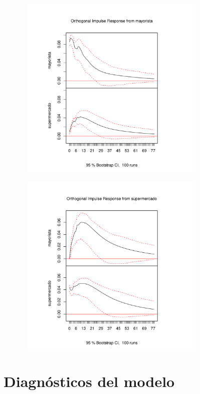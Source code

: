 \documentclass[12pt, twoside]{book}\usepackage[]{graphicx}\usepackage[]{color}
\newenvironment{knitrout}{}{} %
\numberwithin{equation}{section}
\numberwithin{theorem}{section}
\numberwithin{teorema}{section}
\numberwithin{defi}{section}
\numberwithin{prop}{section}
\numberwithin{defi}{section}
\theoremstyle{plain}
\begin{document}
\begin{knitrout}
\color{fgcolor}

{\centering \includegraphics[width=4.5in,height=3.5in]{figure/unnamed-chunk-24-1} 

}




{\centering \includegraphics[width=4.5in,height=3.5in]{figure/unnamed-chunk-24-2} 

}



\end{knitrout}

\section{Diagnósticos del modelo}
\end{document}
